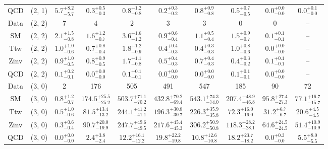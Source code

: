 \begin{table}[h!]
{\begin{tabular}{cccccccccc}
	QCD & (2, 1) & $5.7^{+ 8.2 }_{- 5.7 }$ & $0.3^{+ 0.5 }_{- 0.3 }$ & $0.8^{+ 1.2 }_{- 0.8 }$ & $0.2^{+ 0.3 }_{- 0.2 }$ & $0.8^{+ 0.9 }_{- 0.8 }$ & $0.5^{+ 0.7 }_{- 0.5 }$ & $0.0^{+ 0.0 }_{- 0.0 }$ & $0.0^{+ 0.1 }_{- 0.0 }$ \\[0.5ex] 
	Data & (2, 2) & 7 & 4 & 2 & 3 & 3 & 0 & 0 & -- \\[0.5ex] 
	SM & (2, 2) & $2.1^{+ 1.5 }_{- 0.8 }$ & $1.6^{+ 1.2 }_{- 0.7 }$ & $3.6^{+ 1.6 }_{- 1.2 }$ & $0.9^{+ 0.6 }_{- 0.4 }$ & $1.1^{+ 0.5 }_{- 0.4 }$ & $1.5^{+ 0.9 }_{- 0.7 }$ & $0.1^{+ 0.1 }_{- 0.1 }$ & -- \\[0.5ex] 
	Ttw & (2, 2) & $1.0^{+ 1.0 }_{- 0.6 }$ & $0.7^{+ 0.8 }_{- 0.4 }$ & $1.8^{+ 1.2 }_{- 0.9 }$ & $0.4^{+ 0.4 }_{- 0.3 }$ & $0.4^{+ 0.3 }_{- 0.3 }$ & $1.0^{+ 0.8 }_{- 0.6 }$ & $0.0^{+ 0.0 }_{- 0.0 }$ & -- \\[0.5ex] 
	Zinv & (2, 2) & $0.9^{+ 1.0 }_{- 0.5 }$ & $0.8^{+ 0.9 }_{- 0.5 }$ & $1.7^{+ 1.1 }_{- 0.8 }$ & $0.5^{+ 0.4 }_{- 0.3 }$ & $0.7^{+ 0.4 }_{- 0.3 }$ & $0.4^{+ 0.3 }_{- 0.2 }$ & $0.1^{+ 0.1 }_{- 0.1 }$ & -- \\[0.5ex] 
	QCD & (2, 2) & $0.1^{+ 0.2 }_{- 0.1 }$ & $0.0^{+ 0.0 }_{- 0.0 }$ & $0.1^{+ 0.1 }_{- 0.1 }$ & $0.0^{+ 0.0 }_{- 0.0 }$ & $0.0^{+ 0.0 }_{- 0.0 }$ & $0.1^{+ 0.1 }_{- 0.1 }$ & $0.0^{+ 0.0 }_{- 0.0 }$ & -- \\[0.5ex] 
	Data & (3, 0) & 2 & 176 & 505 & 491 & 547 & 185 & 90 & 72 \\[0.5ex] 
	SM & (3, 0) & $0.8^{+ 1.2 }_{- 0.7 }$ & $174.5^{+ 25.5 }_{- 25.2 }$ & $503.7^{+ 71.1 }_{- 70.2 }$ & $432.8^{+ 70.2 }_{- 69.4 }$ & $543.1^{+ 74.3 }_{- 74.0 }$ & $207.4^{+ 48.9 }_{- 46.8 }$ & $95.8^{+ 27.4 }_{- 27.3 }$ & $77.1^{+ 16.7 }_{- 15.7 }$ \\[0.5ex] 
	Ttw & (3, 0) & $0.5^{+ 1.0 }_{- 0.6 }$ & $81.5^{+ 13.4 }_{- 13.2 }$ & $244.1^{+ 41.2 }_{- 41.1 }$ & $196.3^{+ 30.8 }_{- 30.7 }$ & $226.3^{+ 35.9 }_{- 35.8 }$ & $72.3^{+ 16.0 }_{- 16.0 }$ & $31.2^{+ 6.7 }_{- 6.7 }$ & $20.6^{+ 4.5 }_{- 4.5 }$ \\[0.5ex] 
	Zinv & (3, 0) & $0.3^{+ 0.6 }_{- 0.4 }$ & $90.7^{+ 20.0 }_{- 19.9 }$ & $247.7^{+ 49.6 }_{- 49.5 }$ & $217.6^{+ 45.4 }_{- 45.3 }$ & $306.2^{+ 50.9 }_{- 50.8 }$ & $118.3^{+ 28.2 }_{- 28.1 }$ & $64.6^{+ 24.5 }_{- 24.5 }$ & $51.4^{+ 10.9 }_{- 10.9 }$ \\[0.5ex] 
	QCD & (3, 0) & $0.0^{+ 0.0 }_{- 0.0 }$ & $2.4^{+ 3.8 }_{- 2.4 }$ & $12.2^{+ 16.1 }_{- 12.2 }$ & $19.8^{+ 22.2 }_{- 19.8 }$ & $10.8^{+ 12.6 }_{- 10.8 }$ & $18.2^{+ 23.7 }_{- 18.2 }$ & $0.0^{+ 0.3 }_{- 0.0 }$ & $5.5^{+ 8.0 }_{- 5.5 }$ \\[0.5ex] 

\end{tabular}}
\end{table}
